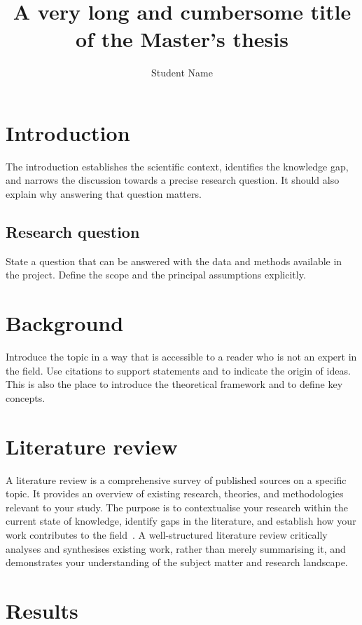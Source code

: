 \documentclass[masters,nl,book,11pt,redheadings]{OU}
\title{A very long and cumbersome title of the Master's thesis}
\author{Student Name}
\begin{document}
\startthesis

\chapter{Introduction}

The introduction establishes the scientific context, identifies the knowledge gap, and narrows the discussion towards a precise research question.
It should also explain why answering that question matters.

\lipsum[1-12]


\section{Research question}

State a question that can be answered with the data and methods available in the project.
Define the scope and the principal assumptions explicitly.

\chapter{Background}

Introduce the topic in a way that is accessible to a reader who is not an expert in the field.
Use citations to support statements and to indicate the origin of ideas.
This is also the place to introduce the theoretical framework and to define key concepts.

\lipsum[13-28]

\chapter{Literature review}

A literature review is a comprehensive survey of published sources on a specific topic.
It provides an overview of existing research, theories, and methodologies relevant to your study.
The purpose is to contextualise your research within the current state of knowledge, identify gaps in the literature, and establish how your work contributes to the field~\cite{Beck2005timeseries}.
A well-structured literature review critically analyses and synthesises existing work, rather than merely summarising it, and demonstrates your understanding of the subject matter and research landscape.

\lipsum[29-44]

\chapter{Results}
\end{document}
